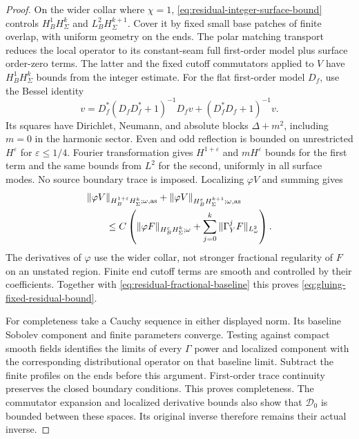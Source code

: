 \documentclass[11pt]{amsart}
\theoremstyle{definition}
\theoremstyle{remark}
\theoremstyle{plain}
\begin{document}
\begin{proof}
On the wider collar where $\chi=1$,
\eqref{eq:residual-integer-surface-bound} controls
$H^1_BH^k_\Sigma$ and $L^2_BH^{k+1}_\Sigma$. Cover it by fixed
small base patches of finite overlap, with uniform geometry on the
ends. The polar matching transport reduces the local operator to
its constant-seam full first-order model plus surface order-zero
terms. The latter and the fixed cutoff commutators applied to $V$
have $H^1_BH^k_\Sigma$ bounds from the integer estimate. For the
flat first-order model $D_f$, use the Bessel identity
\begin{equation}\label{eq:residual-fractional-bessel}
 v=D_f^*(D_fD_f^*+1)^{-1}D_fv+(D_f^*D_f+1)^{-1}v.
\end{equation}
Its squares have Dirichlet, Neumann, and absolute blocks
$\Delta+m^2$, including $m=0$ in the harmonic sector. Even and
odd reflection is bounded on unrestricted $H^\varepsilon$ for
$\varepsilon\leq1/4$. Fourier transformation gives
$H^{1+\varepsilon}$ and $mH^\varepsilon$ bounds for the first
term and the same bounds from $L^2$ for the second, uniformly in
all surface modes. No source boundary trace is imposed. Localizing
$\varphi V$ and summing gives
\[
 \begin{split}
 &\|\varphi V\|_{H_B^{1+\varepsilon}H^k_\Sigma;\omega,{\rm as}}
 +\|\varphi V\|_{H_B^\varepsilon H^{k+1}_\Sigma;\omega,{\rm as}}\\
 &\qquad\leq C\left(
 \|\varphi F\|_{H_B^\varepsilon H^k_\Sigma;\omega}
             +\sum_{j=0}^k\|\Gamma_Y^jF\|_{L^2_\omega}\right).
 \end{split}
\]
The derivatives of $\varphi$ use the wider collar, not stronger
fractional regularity of $F$ on an unstated region. Finite end
cutoff terms are smooth and controlled by their coefficients.
Together with \eqref{eq:residual-fractional-baseline} this proves
\eqref{eq:gluing-fixed-residual-bound}.

For completeness take a Cauchy sequence in either displayed norm.
Its baseline Sobolev component and finite parameters converge.
Testing against compact smooth fields identifies the limits of every
$\Gamma$ power and localized component with the corresponding
distributional operator on that baseline limit. Subtract the finite
profiles on the ends before this argument. First-order trace continuity
preserves the closed boundary conditions. This proves completeness.
The commutator expansion and localized derivative bounds also show
that $\mathscr D_0$ is bounded between these spaces. Its original
inverse therefore remains their actual inverse.
\end{proof}
\end{document}
